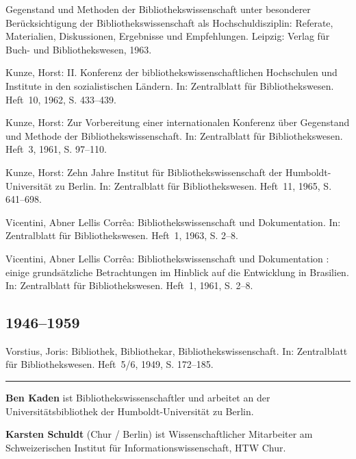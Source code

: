 \documentclass[a4paper,
fontsize=11pt,
oneside,
numbers=noperiodatend,
parskip=half-,
bibliography=totoc,
final
]{scrartcl}
\begin{document}
Gegenstand und Methoden der Bibliothekswissenschaft unter besonderer
Berücksichtigung der Bibliothekswissenschaft als Hochschuldisziplin:
Referate, Materialien, Diskussionen, Ergebnisse und Empfehlungen.
Leipzig: Verlag für Buch- und Bibliothekswesen, 1963.

Kunze, Horst: II. Konferenz der bibliothekswissenschaftlichen
Hochschulen und Institute in den sozialistischen Ländern. In:
Zentralblatt für Bibliothekswesen. Heft~10, 1962, S. 433--439.

Kunze, Horst: Zur Vorbereitung einer internationalen Konferenz über
Gegenstand und Methode der Bibliothekswissenschaft. In: Zentralblatt für
Bibliothekswesen. Heft~3, 1961, S. 97--110.

Kunze, Horst: Zehn Jahre Institut für Bibliothekswissenschaft der
Humboldt-Universität zu Berlin. In: Zentralblatt für Bibliothekswesen.
Heft~11, 1965, S. 641--698.

Vicentini, Abner Lellis Corrêa: Bibliothekswissenschaft und
Dokumentation. In: Zentralblatt für Bibliothekswesen. Heft~1, 1963, S. 2--8.

Vicentini, Abner Lellis Corrêa: Bibliothekswissenschaft und
Dokumentation : einige grundsätzliche Betrachtungen im Hinblick auf die
Entwicklung in Brasilien. In: Zentralblatt für Bibliothekswesen. Heft~1,
1961, S. 2--8.

\hypertarget{section-8}{%
\subsection*{1946--1959}\label{section-8}}

Vorstius, Joris: Bibliothek, Bibliothekar, Bibliothekswissenschaft. In:
Zentralblatt für Bibliothekswesen. Heft~5/6, 1949, S. 172--185.

\begin{center}\rule{0.5\linewidth}{\linethickness}\end{center}

\textbf{Ben Kaden} ist Bibliothekswissenschaftler und arbeitet an der
Universitätsbibliothek der Humboldt-Universität zu Berlin.

\textbf{Karsten Schuldt} (Chur / Berlin) ist Wissenschaftlicher
Mitarbeiter am Schweizerischen Institut für Informationswissenschaft,
HTW Chur.
\end{document}
